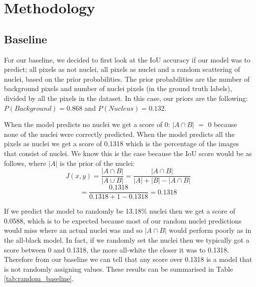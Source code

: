 \documentclass{article}
\begin{document}

\section{Methodology}

\subsection{Baseline}
\label{sec:baseline}
For our baseline, we decided to first look at the IoU accuracy if our model was to predict; 
all pixels as not nuclei, all pixels as nuclei and a random scattering of nuclei, based on the prior probabilities. The prior probabilities are the number of background pixels and number of nuclei pixels (in the ground truth labels), divided by all the pixels in the dataset. In this case, our priors are the following: $P(Background) = 0.868$ and $P(Nucleus) = 0.132$.

When the model predicts no nuclei we get a score of 0: $|A \cap B|$ $=$ 0 because none of the nuclei were correctly predicted. When the model predicts all the pixels as nuclei we get a score of 0.1318 which is the percentage of the images that consist of nuclei. We know this is the case because the IoU score would be as follows, where $|A|$ is the prior of the nuclei:
\[ J(x,y) = \dfrac{|A \cap B|}{|A \cup B|} = \dfrac{|A \cap B|}{|A|+|B|-|A \cap B|}\]
\[ = \dfrac{0.1318}{0.1318+1-0.1318} = 0.1318\]

If we predict the model to randomly be 13.18\% nuclei then we get a score of 0.0588, which is to be expected because most of our random nuclei predictions would miss where an actual nuclei was and so $|A \cap B|$ would perform poorly as in the all-black model. In fact, if we randomly set the nuclei then we typically got a score between 0 and 0.1318, the more all-white the closer it was to 0.1318. Therefore from our baseline we can tell that any score over 0.1318 is a model that is not randomly assigning values. These results can be summarised in Table \ref{tab:random_baseline}.
\end{document}
